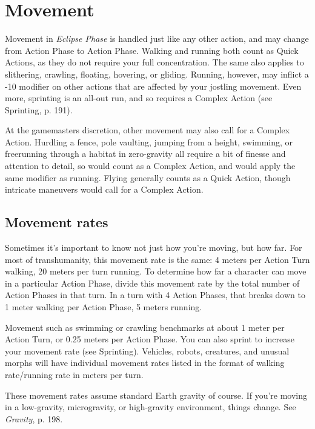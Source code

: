 \section{Movement} \label{sec:combat-movement} 

Movement in \emph{Eclipse Phase} is handled just like any other action, and may change from Action Phase to Action Phase. Walking and running both count as Quick Actions, as they do not require your full concentration. The same also applies to slithering, crawling, floating, hovering, or gliding. Running, however, may inflict a -10 modifier on other actions that are affected by your jostling movement. Even more, sprinting is an all-out run, and so requires a Complex Action (see Sprinting, p. 191). 

At the gamemasters discretion, other movement may also call for a Complex Action. Hurdling a fence, pole vaulting, jumping from a height, swimming, or freerunning through a habitat in zero-gravity all require a bit of finesse and attention to detail, so would count as a Complex Action, and would apply the same modifier as running. Flying generally counts as a Quick Action, though intricate maneuvers would call for a Complex Action. 



\subsection{Movement rates} \label{sec:movement-rates} 

Sometimes it’s important to know not just how you’re moving, but how far. For most of transhumanity, this movement rate is the same: 4 meters per Action Turn walking, 20 meters per turn running. To determine how far a character can move in a particular Action Phase, divide this movement rate by the total number of Action Phases in that turn. In a turn with 4 Action Phases, that breaks down to 1 meter walking per Action Phase, 5 meters running. 

Movement such as swimming or crawling benchmarks at about 1 meter per Action Turn, or 0.25 meters per Action Phase. You can also sprint to increase your movement rate (see Sprinting). Vehicles, robots, creatures, and unusual morphs will have individual movement rates listed in the format of walking rate/running rate in meters per turn. 

These movement rates assume standard Earth gravity of course. If you’re moving in a low-gravity, microgravity, or high-gravity environment, things change. See \emph{Gravity}, p. 198. 



